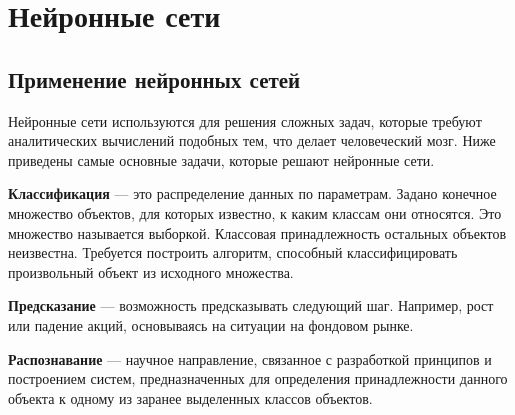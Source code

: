 \newpage

\chapter{Нейронные сети}
\section{Применение нейронных сетей}

\indent\indent Нейронные сети используются для решения сложных задач, которые требуют аналитических вычислений подобных тем, что делает человеческий мозг. Ниже приведены самые основные задачи, которые решают нейронные сети.

 \textbf{Классификация} — это распределение данных по параметрам. Задано конечное множество объектов, для которых известно, к каким классам они относятся. Это множество называется выборкой. Классовая принадлежность остальных объектов неизвестна. Требуется построить алгоритм, способный классифицировать произвольный объект из исходного множества.

 \textbf{Предсказание} — возможность предсказывать следующий шаг. Например, рост или падение акций, основываясь на ситуации на фондовом рынке. 

 \textbf{Распознавание} — научное направление, связанное с разработкой принципов и построением систем, предназначенных для определения принадлежности данного объекта к одному из заранее выделенных классов объектов.

